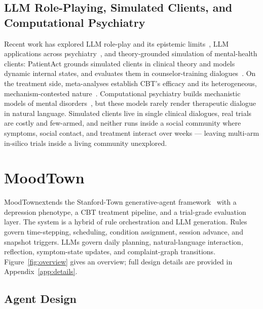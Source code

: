 \documentclass[10pt]{article}
\newcommand{\sys}{MoodTown}
\begin{document}
\subsection{LLM Role-Playing, Simulated Clients, and Computational Psychiatry}\label{sec:related-clinical}

Recent work has explored LLM role-play and its epistemic limits~\citep{shanahan2023}, LLM applications across psychiatry~\citep{volkmer2024,stade2024}, and theory-grounded simulation of mental-health clients: PatientAct grounds simulated clients in clinical theory and models dynamic internal states, and evaluates them in counselor-training dialogues~\citep{patientact2026}.
On the treatment side, meta-analyses establish CBT's efficacy and its heterogeneous, mechanism-contested nature~\citep{cuijpers2013,hofmann2012,cuijpers2023,lambert1992}.
Computational psychiatry builds mechanistic models of mental disorders~\citep{montague2012,hauser2022,friston2023,zavlis2025}, but these models rarely render therapeutic dialogue in natural language.
Simulated clients live in single clinical dialogues, real trials are costly and few-armed, and neither runs inside a social community where symptoms, social contact, and treatment interact over weeks --- leaving multi-arm in-silico trials inside a living community unexplored.

\section{\sys}\label{sec:system}

\sys extends the Stanford-Town generative-agent framework~\citep{park2023} with a depression phenotype, a CBT treatment pipeline, and a trial-grade evaluation layer.
The system is a hybrid of rule orchestration and LLM generation.
Rules govern time-stepping, scheduling, condition assignment, session advance, and snapshot triggers.
LLMs govern daily planning, natural-language interaction, reflection, symptom-state updates, and complaint-graph transitions.
Figure~\ref{fig:overview} gives an overview; full design details are provided in Appendix~\ref{app:details}.

\subsection{Agent Design}\label{sec:agent}
\end{document}
